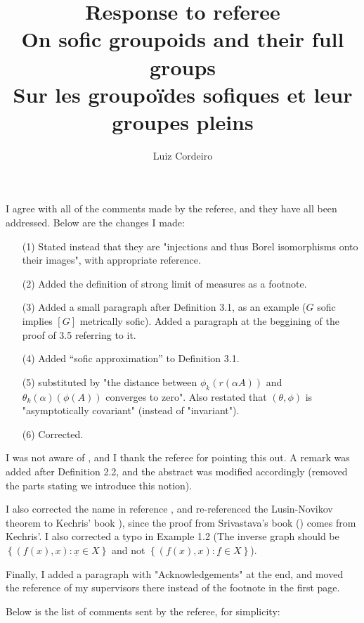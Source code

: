 \documentclass[11pt]{amsart}
\author{Luiz Cordeiro}
\title{Response to referee\\On sofic groupoids and their full groups\\Sur les groupoïdes sofiques et leur groupes pleins}
\theoremstyle{plain}		\newtheorem{theorem}[generalnumbering]{Theorem}
\theoremstyle{plain}		\newtheorem{corollary}[generalnumbering]{Corollary}
\theoremstyle{definition}		\newtheorem{definition}[generalnumbering]{Definition}
\theoremstyle{definition}		\newtheorem{example}[generalnumbering]{Example}
\theoremstyle{plain}		\newtheorem{proposition}[generalnumbering]{Proposition}
\theoremstyle{plain}		\newtheorem{lemma}[generalnumbering]{Lemma}
\begin{document}
\maketitle

I agree with all of the comments made by the referee, and they have all been addressed. Below are the changes I made:
\begin{enumerate}
\item[(1)] Stated instead that they are "injections and thus Borel isomorphisms onto their images", with appropriate reference.
\item[(2)] Added the definition of strong limit of measures as a footnote.
\item[(3)] Added a small paragraph after Definition 3.1, as an example ($G$ sofic implies $[G]$ metrically sofic). Added a paragraph at the beggining of the proof of 3.5 referring to it.
\item[(4)] Added ``sofic approximation'' to Definition 3.1.
\item[(5)] substituted by "the distance between $\phi_k(r(\alpha A))$ and $\theta_k(\alpha)(\phi(A))$ converges to zero". Also restated that $(\theta,\phi)$ is "asymptotically covariant" (instead of "invariant").
\item[(6)] Corrected.
\end{enumerate}

I was not aware of \cite{MR3229595}, and I thank the referee for pointing this out. A remark was added after Definition 2.2, and the abstract was modified accordingly (removed the parts stating we introduce this notion).

I also corrected the name in reference \cite{MR2826401}, and re-referenced the Lusin-Novikov theorem to Kechris' book \cite{MR1321597}), since the proof from Srivastava's book (\cite{MR1619545}) comes from Kechris'. I also corrected a typo in Example 1.2 (The inverse graph should be $\left\{(f(x),x):{\underline{x}}\in X\right\}$ and not $\left\{(f(x),x):{\underline{f}}\in X\right\}$).

Finally, I added a paragraph with "Acknowledgements" at the end, and moved the reference of my supervisors there instead of the footnote in the first page.

Below is the list of comments sent by the referee, for simplicity:
\end{document}
